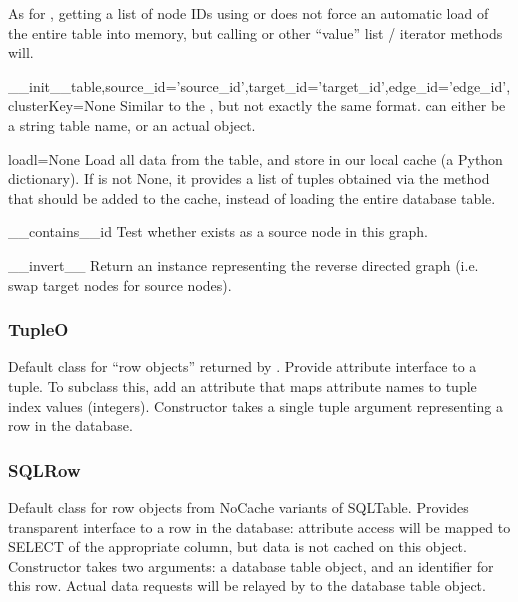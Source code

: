 \documentclass{howto}
\begin{document}
As for , getting a list of node IDs using
 or  does not force an automatic load of 
the entire table into memory, but calling  or
other ``value'' list / iterator methods will.

\begin{funcdesc}{__init__}{table,source_id='source_id',target_id='target_id',edge_id='edge_id',clusterKey=None}
  Similar to the , but not exactly the same format.
   can either be a string table name, or an actual 
   object.
\end{funcdesc}

\begin{funcdesc}{load}{l=None}
  Load all data from the table, and store in our local cache (a
  Python dictionary).  If  is not None, it provides a
  list of tuples obtained via the  method that
  should be added to the cache, instead of loading the entire
  database table.
\end{funcdesc}

\begin{funcdesc}{__contains__}{id}
  Test whether  exists as a source node in this graph.
\end{funcdesc}

\begin{funcdesc}{__invert__}{}
  Return an  instance representing the reverse 
  directed graph (i.e. swap target nodes for source nodes).
\end{funcdesc}

\subsubsection{TupleO}
Default class for ``row objects'' returned by .
Provide attribute interface to a tuple.  To subclass this,
add an  attribute
that maps attribute names to tuple index values (integers).
Constructor takes a single tuple argument representing a
row in the database.

\subsubsection{SQLRow}
Default class for row objects from NoCache variants of SQLTable.
Provides transparent interface to a row in the database: attribute access
will be mapped to SELECT of the appropriate column, but data is not cached
on this object.  Constructor takes two arguments: a database table
object, and an identifier for this row.  Actual data requests will
be relayed by  to the database table object.
\end{document}
